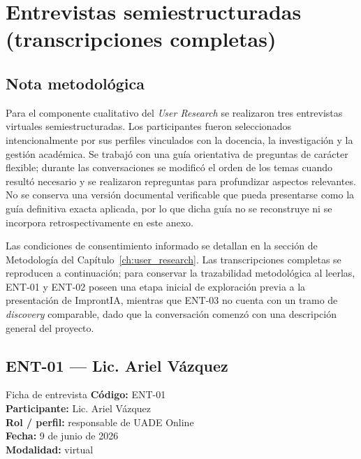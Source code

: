 \chapter{Entrevistas semiestructuradas (transcripciones completas)}
\label{apx:entrevistas}

\section*{Nota metodológica}
Para el componente cualitativo del \textit{User Research} se realizaron tres entrevistas virtuales semiestructuradas. Los participantes fueron seleccionados intencionalmente por sus perfiles vinculados con la docencia, la investigación y la gestión académica. Se trabajó con una guía orientativa de preguntas de carácter flexible; durante las conversaciones se modificó el orden de los temas cuando resultó necesario y se realizaron repreguntas para profundizar aspectos relevantes. No se conserva una versión documental verificable que pueda presentarse como la guía definitiva exacta aplicada, por lo que dicha guía no se reconstruye ni se incorpora retrospectivamente en este anexo.

Las condiciones de consentimiento informado se detallan en la sección de Metodología del Capítulo~\ref{ch:user_research}. Las transcripciones completas se reproducen a continuación; para conservar la trazabilidad metodológica al leerlas, ENT-01 y ENT-02 poseen una etapa inicial de exploración previa a la presentación de ImprontIA, mientras que ENT-03 no cuenta con un tramo de \textit{discovery} comparable, dado que la conversación comenzó con una descripción general del proyecto.

\section*{ENT-01 --- Lic. Ariel Vázquez}
\begin{ficha}{Ficha de entrevista}
\small
\textbf{Código:} ENT-01\\[2pt]
\textbf{Participante:} Lic. Ariel Vázquez\\[2pt]
\textbf{Rol / perfil:} responsable de UADE Online\\[2pt]
\textbf{Fecha:} 9 de junio de 2026\\[2pt]
\textbf{Modalidad:} virtual\\[2pt]
\end{ficha}
